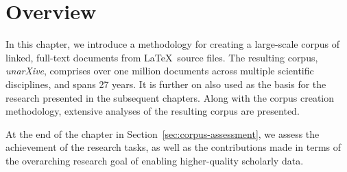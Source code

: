 \section{Overview}
In this chapter, we introduce a methodology for creating a large-scale corpus of linked, full-text documents from \LaTeX\ source files. The resulting corpus, \emph{unarXive}, comprises over one million documents across multiple scientific disciplines, and spans 27 years. It is further on also used as the basis for the research presented in the subsequent chapters. Along with the corpus creation methodology, extensive analyses of the resulting corpus are presented.

At the end of the chapter in Section~\ref{sec:corpus-assessment}, we assess the achievement of the research tasks, as well as the contributions made in terms of the overarching research goal of enabling higher-quality scholarly data.


